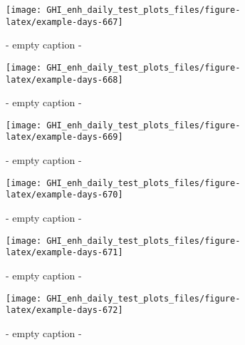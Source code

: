 \documentclass[
  10pt,
  a4paper,oneside]{article}
\begin{document}
\begin{figure}[H]

{\centering \texttt{[image: GHI\_enh\_daily\_test\_plots\_files/figure-latex/example-days-667]} 

}

\caption{ - empty caption - }\label{fig:example-days-667}
\end{figure}

\begin{figure}[H]

{\centering \texttt{[image: GHI\_enh\_daily\_test\_plots\_files/figure-latex/example-days-668]} 

}

\caption{ - empty caption - }\label{fig:example-days-668}
\end{figure}

\begin{figure}[H]

{\centering \texttt{[image: GHI\_enh\_daily\_test\_plots\_files/figure-latex/example-days-669]} 

}

\caption{ - empty caption - }\label{fig:example-days-669}
\end{figure}

\begin{figure}[H]

{\centering \texttt{[image: GHI\_enh\_daily\_test\_plots\_files/figure-latex/example-days-670]} 

}

\caption{ - empty caption - }\label{fig:example-days-670}
\end{figure}

\begin{figure}[H]

{\centering \texttt{[image: GHI\_enh\_daily\_test\_plots\_files/figure-latex/example-days-671]} 

}

\caption{ - empty caption - }\label{fig:example-days-671}
\end{figure}

\begin{figure}[H]

{\centering \texttt{[image: GHI\_enh\_daily\_test\_plots\_files/figure-latex/example-days-672]} 

}

\caption{ - empty caption - }\label{fig:example-days-672}
\end{figure}
\end{document}
